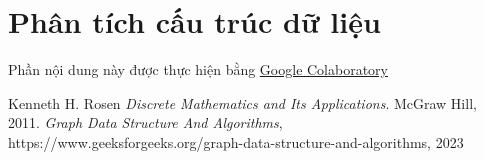 \documentclass[a4paper]{article}
\begin{document}
    
\section{Phân tích cấu trúc dữ liệu}
    Phần nội dung này được thực hiện bằng \href{https://colab.research.google.com/drive/1dHanve62S-d2Vg_uwdXUcYrodxyqyYT6#scrollTo=9IctQIRut1bi}{Google Colaboratory}




\begin{thebibliography}{80}





Kenneth H. Rosen \emph{Discrete Mathematics and Its Applications}. McGraw Hill, 2011.
 \emph {Graph Data Structure And Algorithms}, https://www.geeksforgeeks.org/graph-data-structure-and-algorithms, 2023

\end{thebibliography}
\end{document}
